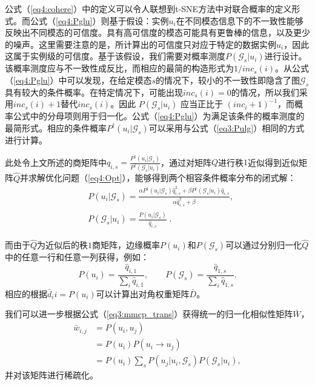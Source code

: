 公式（\ref{eq4:cohere}）中的定义可以令人联想到t-SNE\cite{maaten2008visualizing}方法中对联合概率的定义形式。而公式（\ref{eq4:Pglu}）则基于假设：实例$u_i$在不同模态信息下的不一致性能够反映出不同模态的可信度。具有高可信度的模态可能具有更鲁棒的信息，以及更少的噪声。这里需要注意的是，所计算出的可信度只对应于特定的数据实例$u_i$，因此这属于实例级的可信度。基于该假设，我们需要对概率测度$ P(\mathcal{G}_s|u_i) $进行设计。该概率测度应与不一致性成反比，而相应的最简的构造形式为$ 1/inc_s(i) $。从公式（\ref{eq4:Pglu}）中可以发现，在给定模态$s$的情况下，较小的不一致性即隐含了图$\mathcal{G}_s$具有较大的条件概率。在特定情况下，可能出现$ inc_s(i) =0 $的情况，所以我们采用$ inc_s(i) +1 $替代$ inc_s(i)$。因此 $ P(\mathcal{G}_s|u_i) $ 应当正比于 $ (inc_i+1)^{-1} $，而概率公式中的分母项则用于归一化。公式（\ref{eq4:Pglu}）为满足该条件的概率测度的最简形式。相应的条件概率$P^\dagger(u_i|\mathcal{G}_s)$可以采用与公式（\ref{eq3:Pulg}）相同的方式进行计算。

此处令上文所述的商矩阵中$q_{i,s} = \frac{P^\dagger(u_i|\mathcal{G}_s)}{P^\dagger(\mathcal{G}_s|u_i)}$，通过对矩阵$Q$进行秩$1$近似得到近似矩阵$\hat{Q}$并求解优化问题（\ref{eq4:Opt}），能够得到两个相容条件概率分布的闭式解：
\begin{equation}
\begin{split}
&P(u_i|\mathcal{G}_s) = \frac{\alpha P^\dagger(u_i|\mathcal{G}_s)\hat{{q}}_{i,s}^2+\beta P^\dagger(\mathcal{G}_s|u_i)\hat{{q}}_{i,s}}{\alpha \hat{{q}}_{i,s}^2 + \beta},\\
&P(\mathcal{G}_s|u_i) = \frac{P(u_i|\mathcal{G}_s)}{\hat{{q}}_{i,s}}\;. 
\end{split}
\label{eq4:OptSlv}
\end{equation}

而由于$\hat{Q}$为近似后的秩$1$商矩阵，边缘概率$P(u_i)$和$P(\mathcal{G}_s)$可以通过分别归一化$\hat{Q}$中的任意一行和任意一列获得，例如：
\begin{equation}
    P(u_i) = \frac{\hat{q}_{i,1}}{\sum_i\hat{q}_{i,1}}, \quad\quad P(\mathcal{G}_s) = \frac{\hat{q}_{1,s}}{\sum_i\hat{q}_{1,s}}.
\end{equation}
相应的根据$\bar{d}_ii=P(u_i)$可以计算出对角权重矩阵$\bar{D}$。

我们可以进一步根据公式（\ref{eq3:mmcp_trans}）获得统一的归一化相似性矩阵$\bar{W}$，
\begin{equation}
\begin{split}
\bar{w}_{i,j} &= P(u_i,u_j) \\ &= P(u_i)P(u_i\rightarrow u_j)\\
&=P(u_i)\sum_s P(u_j|u_i, \mathcal{G}_s)P(\mathcal{G}_s|u_i), 
\end{split}
\label{eq4:uni_aff}
\end{equation}
并对该矩阵进行稀疏化。


